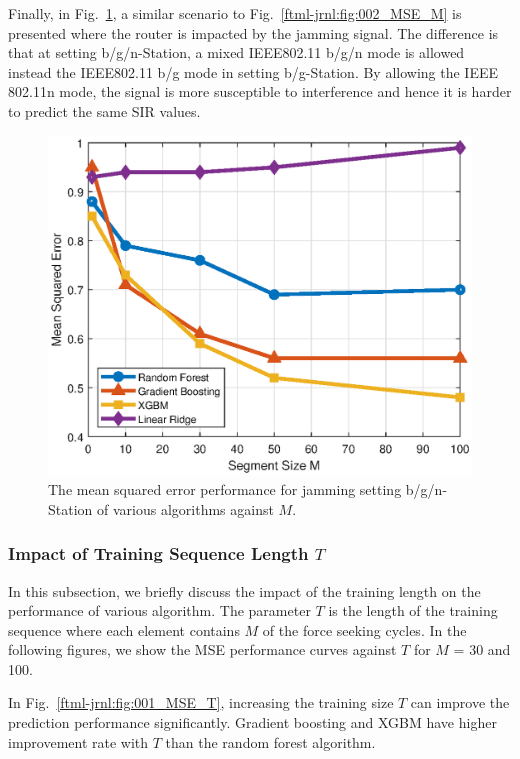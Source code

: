 Finally, in Fig.~\ref{ftml-jrnl:fig:004_MSE_M}, a similar scenario to Fig.~\ref{ftml-jrnl:fig:002_MSE_M} is presented where the router is impacted by the jamming signal. The difference is that at setting b/g/n-Station, a mixed IEEE802.11 b/g/n mode is allowed instead the IEEE802.11 b/g mode in setting b/g-Station. By allowing the IEEE 802.11n mode, the signal is more susceptible to interference and hence it is harder to predict the same SIR values. 

\begin{figure}[!ht]
	\centering
	\includegraphics[width=0.9\columnwidth]{./chapter-ftml/plots/004_MSE_M.eps}
	\caption{The mean squared error performance for jamming setting b/g/n-Station of various algorithms against $M$.}
	\label{ftml-jrnl:fig:004_MSE_M}      
\end{figure}

\subsubsection{Impact of Training Sequence Length $T$}
In this subsection, we briefly discuss the impact of the training length on the performance of various algorithm. The parameter $T$ is the length of the training sequence where each element contains $M$ of the force seeking cycles. In the following figures, we show the MSE performance curves against $T$ for $M$ = 30 and 100. 

In Fig.~\ref{ftml-jrnl:fig:001_MSE_T}, increasing the training size $T$ can improve the prediction performance significantly. Gradient boosting and XGBM have higher improvement rate with $T$ than the random forest algorithm. 


